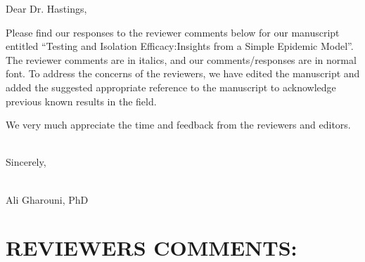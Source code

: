 \documentclass[12pt]{article}
\DeclareRobustCommand\_{\ifmmode\expandafter\subtxt\else\textunderscore\fi}
\begin{document}
\noindent
Dear Dr. Hastings,

Please find our responses to the reviewer comments below for our manuscript entitled
``Testing and Isolation Efficacy:Insights from a Simple Epidemic Model''. The reviewer comments are in italics, and our comments/responses are in normal font. To address the concerns of the reviewers, we have edited the manuscript and added the suggested appropriate reference to the manuscript to acknowledge previous known results in the field.

We very much appreciate the time and feedback from the reviewers and editors.

\noindent
\\
Sincerely,

\noindent
\\
Ali Gharouni, PhD


\linenumbers

\section*{REVIEWERS COMMENTS:}
\end{document}
